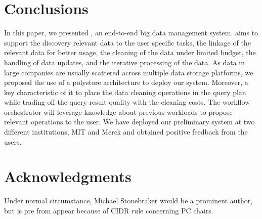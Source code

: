 \section{Conclusions}
\label{sec:conclusion}

In this paper, we presented \dcv,  an end-to-end big data management system. \dcv aims to support 
the discovery relevant data to the user specific tasks, 
the linkage of the relevant data for better usage, 
the cleaning of the data under limited budget, 
the handling of  data updates, 
and the iterative processing of the data. 
As data in large companies are usually scattered across multiple
data storage platforms, we proposed the use of a polystore architecture to deploy our system.
Moreover, a key characteristic of \dcv it to place the data cleaning operations in the query plan
while  trading-off the query result quality with the cleaning costs. 
The \dcv workflow orchestrator will leverage knowledge about previous workloads to propose relevant operations to the user.
We have deployed our preliminary system at two different institutions, MIT and Merck and obtained positive
feedback from the users.

\section{Acknowledgments}

Under normal circumstance, Michael Stonebraker would be a prominent author, but is pre from appear because of CIDR rule concerning PC chairs.


